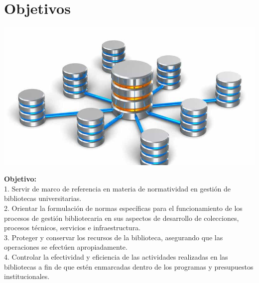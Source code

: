 \section{Objetivos} 
\vspace{16mm} %
\begin{center}
\includegraphics[width=17cm]{./Imagenes/001}
\end{center}	
\vspace{12mm} %

\textbf{Objetivo:}\\

1. Servir de marco de referencia en materia de normatividad en gestión de bibliotecas universitarias. \\
2. Orientar la formulación de normas específicas para el funcionamiento de los procesos de gestión bibliotecaria en sus aspectos de desarrollo de colecciones, procesos técnicos, servicios e infraestructura. \\
3. Proteger y conservar los recursos de la biblioteca, asegurando que las operaciones se efectúen apropiadamente. \\
4. Controlar la efectividad y eficiencia de las actividades realizadas en las bibliotecas a fin de que estén enmarcadas dentro de los programas y presupuestos institucionales.




